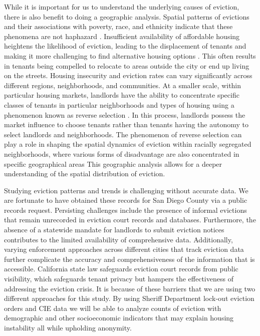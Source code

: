 \documentclass[man, 12pt, donotrepeattitle, floatsintext]{apa7} %
\begin{document}
While it is important for us to understand the underlying causes of eviction, there is also benefit to doing a geographic analysis. Spatial patterns of evictions and their associations with poverty, race, and ethnicity indicate that these phenomena are not haphazard \parencite{Medina2020102804}. Insufficient availability of affordable housing heightens the likelihood of eviction, leading to the displacement of tenants and making it more challenging to find alternative housing options \parencite{NelsonKyle2021SCaS}. This often results in tenants being compelled to relocate to areas outside the city or end up living on the streets. Housing insecurity and eviction rates can vary significantly across different regions, neighborhoods, and communities. At a smaller scale, within particular housing markets, landlords have the ability to concentrate specific classes of tenants in particular neighborhoods and types of housing using a phenomenon known as reverse selection \parencite{NelsonKyle2021SCaS}. In this process, landlords possess the market influence to choose tenants rather than tenants having the autonomy to select landlords and neighborhoods. The phenomenon of reverse selection can play a role in shaping the spatial dynamics of eviction within racially segregated neighborhoods, where various forms of disadvantage are also concentrated in specific geographical areas \parencite{NelsonKyle2021SCaS} This geographic analysis allows for a deeper understanding of the spatial distribution of eviction.

Studying eviction patterns and trends is challenging without accurate data. We are fortunate to have obtained these records for San Diego County via a public records request. Persisting challenges include the presence of informal evictions that remain unrecorded in eviction court records and databases\parencite{Cheng2021}. Furthermore, the absence of a statewide mandate for landlords to submit eviction notices contributes to the limited availability of comprehensive data. Additionally, varying enforcement approaches across different cities that track eviction data further complicate the accuracy and comprehensiveness of the information that is accessible. California state law safeguards eviction court records from public visibility, which safeguards tenant privacy but hampers the effectiveness of addressing the eviction crisis. It is because of these barriers that we are using two different approaches for this study. By using Sheriff Department lock-out eviction orders and CIE data we will be able to analyze counts of eviction with demographic and other socioeconomic indicators that may explain housing instability all while upholding anonymity. 
\end{document}
